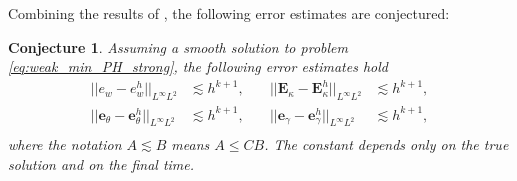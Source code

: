 \documentclass{ifacconf}
\newtheorem{conjecture}{Conjecture}
\begin{document}
Combining the results of \cite{becacheWave,becacheElas}, the following error estimates are conjectured:
\begin{conjecture}
Assuming a smooth solution to problem \eqref{eq:weak_min_PH_strong}, the following error estimates hold 
\begin{equation}
\begin{aligned}
||e_w - e_w^h||_{L^{\infty} L^2} &\lesssim h^{k+1}, \\
||\bm{e}_\theta - \bm{e}_\theta^h||_{L^{\infty} L^2} &\lesssim h^{k+1}, \\
\end{aligned} \quad
\begin{aligned}
||\bm{E}_\kappa - \bm{E}_\kappa^h||_{L^{\infty} L^2} &\lesssim  h^{k+1}, \\
||\bm{e}_\gamma - \bm{e}_\gamma^ h||_{L^{\infty} L^2} &\lesssim  h^{k+1}, \\
\end{aligned} 
\end{equation}
where the notation $A \lesssim B$ means $A \le C B$. The constant depends only on the true solution and on the final time.
\end{conjecture}
\end{document}
